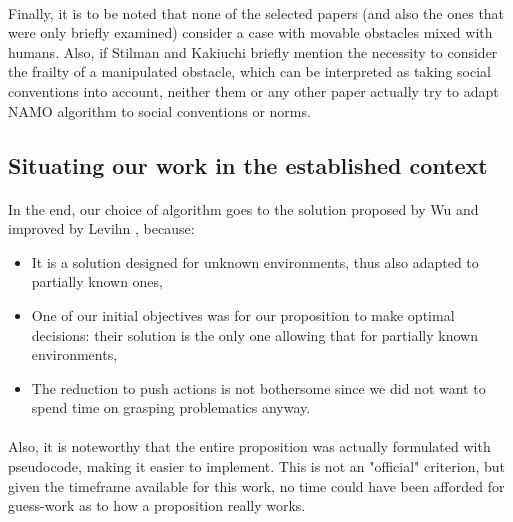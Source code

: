 \paragraph{} Finally, it is to be noted that none of the selected papers (and also the ones that were only briefly examined) consider a case with movable obstacles mixed with humans. Also, if Stilman \parencite{stilman_navigation_2005} and Kakiuchi \parencite{kakiuchi_working_2010} briefly mention the necessity to consider the frailty of a manipulated obstacle, which can be interpreted as taking social conventions into account, neither them or any other paper actually try to adapt NAMO algorithm to social conventions or norms.

\subsection{Situating our work in the established context}

\paragraph{} In the end, our choice of algorithm goes to the solution proposed by Wu and improved by Levihn \parencite{wu_navigation_2010, levihn_locally_2014}, because:
\begin{itemize}
  \item It is a solution designed for unknown environments, thus also adapted to partially known ones,
  \item One of our initial objectives was for our proposition to make optimal decisions: their solution is the only one allowing that for partially known environments,
  \item The reduction to push actions is not bothersome since we did not want to spend time on grasping problematics anyway.
\end{itemize}

\paragraph{}Also, it is noteworthy that the entire proposition was actually formulated with pseudocode, making it easier to implement. This is not an "official" criterion, but given the timeframe available for this work, no time could have been afforded for guess-work as to how a proposition really works.
